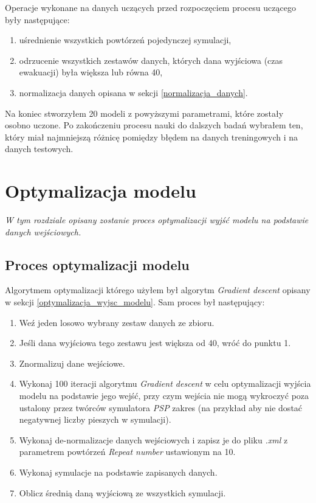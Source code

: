 \documentclass[12pt]{aghdpl}
\begin{document}
		Operacje wykonane na danych uczących przed rozpoczęciem procesu uczącego były następujące:
		\begin{enumerate}
		\item uśrednienie wszystkich powtórzeń pojedynczej symulacji,
		\item odrzucenie wszystkich zestawów danych, których dana wyjściowa (czas ewakuacji) była większa lub równa 40,
		\item normalizacja danych opisana w sekcji \ref{normalizacja_danych}.		
		\end{enumerate}
		
		Na koniec stworzyłem 20 modeli z powyższymi parametrami, które zostały osobno uczone. Po zakończeniu procesu nauki do dalszych badań wybrałem ten, który miał najmniejszą różnicę pomiędzy błędem na danych treningowych i na danych testowych.
		
	\chapter{Optymalizacja modelu}
	\textit{W tym rozdziale opisany zostanie proces optymalizacji wyjść modelu na podstawie danych wejściowych.}

		\section{Proces optymalizacji modelu}
		Algorytmem optymalizacji którego użyłem był algorytm \textit{Gradient descent} opisany w sekcji \ref{optymalizacja_wyjsc_modelu}. Sam proces był następujący:
		\begin{enumerate}
		\item Weź jeden losowo wybrany zestaw danych ze zbioru.
		\item Jeśli dana wyjściowa tego zestawu jest większa od 40, wróć do punktu 1.
		\item Znormalizuj dane wejściowe.
		\item Wykonaj 100 iteracji algorytmu \textit{Gradient descent} w celu optymalizacji wyjścia modelu na podstawie jego wejść, przy czym wejścia nie mogą wykroczyć poza ustalony przez twórców symulatora \textit{PSP} zakres (na przykład aby nie dostać negatywnej liczby pieszych w symulacji).
		\item Wykonaj de-normalizacje danych wejściowych i zapisz je do pliku \textit{.xml} z parametrem powtórzeń \textit{Repeat number} ustawionym na 10.
		\item Wykonaj symulacje na podstawie zapisanych danych.
		\item Oblicz średnią daną wyjściową ze wszystkich symulacji.
		\end{enumerate}
		
\end{document}
